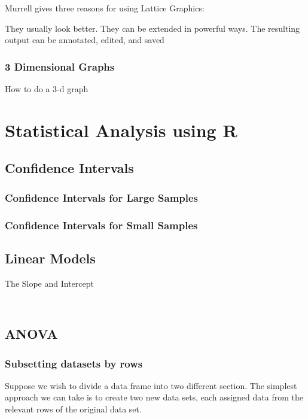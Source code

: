 \documentclass[a4paper,12pt]{article}
\begin{document}
\begin{itemize}
	Murrell gives three reasons for using Lattice Graphics:
	
	They usually look better.
	They can be extended in powerful ways.
	The resulting output can be annotated, edited, and saved
	
	\subsection{3 Dimensional Graphs}
	How to do a 3-d graph
	
	\newpage
	\chapter{Statistical Analysis using R}
	\section{Confidence Intervals}
	\subsection{Confidence Intervals for Large Samples}
	\subsection{Confidence Intervals for Small Samples}
	
	\section{Linear Models}
	
	The Slope and Intercept
	\begin{framed}
		\begin{verbatim}
		
		\end{verbatim}
	\end{framed}
	
	\section{ANOVA}
	
	

	
	
	
	
	
	\subsection{Subsetting datasets by rows}
	
	Suppose we wish to divide a data frame into two different section. The simplest approach we can take is to create two new data sets, each assigned data from the relevant rows of the original data set.
	

\end{itemize}
\end{document}
